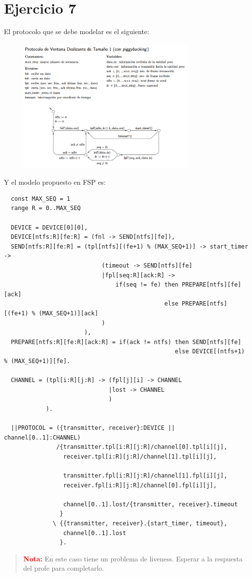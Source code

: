 \documentclass{article}
\begin{document}
\section*{Ejercicio 7}
El protocolo que se debe modelar es el siguiente:
\begin{figure}[ht]
	\includegraphics[width=0.8\textwidth]{02-07.png}
	\centering
\end{figure}

Y el modelo propuesto en FSP es:
\begin{verbatim}
  const MAX_SEQ = 1
  range R = 0..MAX_SEQ

  DEVICE = DEVICE[0][0],
  DEVICE[ntfs:R][fe:R] = (fnl -> SEND[ntfs][fe]),
  SEND[ntfs:R][fe:R] = (tpl[ntfs][(fe+1) % (MAX_SEQ+1)] -> start_timer -> 
                            (timeout -> SEND[ntfs][fe]
                            |fpl[seq:R][ack:R] -> 
                                if(seq != fe) then PREPARE[ntfs][fe][ack]
                                              else PREPARE[ntfs][(fe+1) % (MAX_SEQ+1)][ack]
                            )
                       ),
  PREPARE[ntfs:R][fe:R][ack:R] = if(ack != ntfs) then SEND[ntfs][fe]
                                                 else DEVICE[(ntfs+1) % (MAX_SEQ+1)][fe].

  CHANNEL = (tpl[i:R][j:R] -> (fpl[j][i] -> CHANNEL
                              |lost -> CHANNEL 
                              )
            ).

  ||PROTOCOL = ({transmitter, receiver}:DEVICE || channel[0..1]:CHANNEL)
               /{transmitter.tpl[i:R][j:R]/channel[0].tpl[i][j],
                 receiver.tpl[i:R][j:R]/channel[1].tpl[i][j],

                 transmitter.fpl[i:R][j:R]/channel[1].fpl[i][j],
                 receiver.fpl[i:R][j:R]/channel[0].fpl[i][j],

                 channel[0..1].lost/{transmitter, receiver}.timeout
                }
              \ {{transmitter, receiver}.{start_timer, timeout},
                 channel[0..1].lost 
                }.
\end{verbatim}
\begin{quotation}
	\textbf{\textcolor{red}{Nota:}} En este caso tiene un problema de liveness. Esperar a la respuesta del profe para completarlo.
\end{quotation}
\end{document}
